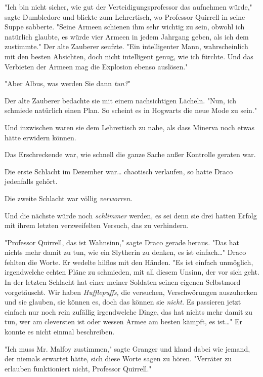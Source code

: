 {"Ich bin nicht sicher, wie gut der Verteidigungsprofessor das aufnehmen würde," sagte Dumbledore und blickte zum Lehrertisch, wo Professor Quirrell in seine Suppe sabberte. "Seine Armeen schienen ihm sehr wichtig zu sein, obwohl ich natürlich glaubte, es würde vier Armeen in jedem Jahrgang geben, als ich dem zustimmte." Der alte Zauberer seufzte. "Ein intelligenter Mann, wahrscheinlich mit den besten Absichten, doch nicht intelligent genug, wie ich fürchte. Und das Verbieten der Armeen mag die Explosion ebenso auslösen."

"Aber Albus, was werden Sie dann \emph{tun?}"

Der alte Zauberer bedachte sie mit einem nachsichtigen Lächeln. "Nun, ich schmiede natürlich einen Plan. So scheint es in Hogwarts die neue Mode zu sein."

Und inzwischen waren sie dem Lehrertisch zu nahe, als dass Minerva noch etwas hätte erwidern können.

\later

Das Erschreckende war, wie schnell die ganze Sache außer Kontrolle geraten war.

Die erste Schlacht im Dezember war… chaotisch verlaufen, so hatte Draco jedenfalls gehört.

Die zweite Schlacht war völlig \emph{verworren.}

Und die nächste würde noch \emph{schlimmer} werden, es sei denn sie drei hatten Erfolg mit ihrem letzten verzweifelten Versuch, das zu verhindern.

"Professor Quirrell, das ist Wahnsinn," sagte Draco gerade heraus. "Das hat nichts mehr damit zu tun, wie ein Slytherin zu denken, es ist einfach…" Draco fehlten die Worte. Er wedelte hilflos mit den Händen. "Es ist einfach unmöglich, irgendwelche echten Pläne zu schmieden, mit all diesem Unsinn, der vor sich geht. In der letzten Schlacht hat einer meiner Soldaten seinen eigenen Selbstmord vorgetäuscht. Wir haben \emph{Hufflepuffs,} die versuchen, Verschwörungen auszuhecken und sie glauben, sie können es, doch das können sie \emph{nicht.} Es passieren jetzt einfach nur noch rein zufällig irgendwelche Dinge, das hat nichts mehr damit zu tun, wer am cleversten ist oder wessen Armee am besten kämpft, es ist…" Er konnte es nicht einmal beschreiben.

"Ich muss Mr. Malfoy zustimmen," sagte Granger und kland dabei wie jemand, der niemals erwartet hätte, sich diese Worte sagen zu hören. "Verräter zu erlauben funktioniert nicht, Professor Quirrell."

}
